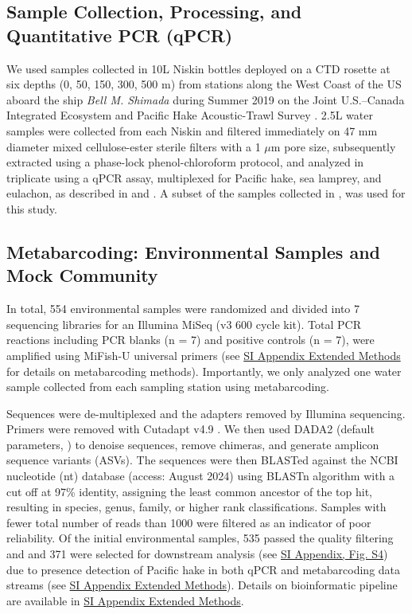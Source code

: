 \documentclass{article}
\begin{document}
\subsection*{Sample Collection, Processing, and Quantitative PCR (qPCR)}
We used samples collected in 10L Niskin bottles deployed on a CTD rosette at six depths (0, 50, 150, 300, 500 m) from stations along the West Coast of the US aboard the ship \textit{Bell M. Shimada} during Summer 2019 on the Joint U.S.–Canada Integrated Ecosystem and Pacific Hake Acoustic-Trawl Survey \cite{deblois2020}. 2.5L water samples were collected from each Niskin and filtered immediately on 47 mm diameter mixed cellulose-ester sterile filters with a 1 $\mu$m pore size, subsequently extracted using a phase-lock phenol-chloroform protocol, and analyzed in triplicate using a qPCR assay, multiplexed for Pacific hake, sea lamprey, and eulachon, as described in \cite{ramon-laca2021} and \cite{shelton2022}. A subset of the samples collected in \cite{shelton2022}, was used for this study. 

\subsection*{Metabarcoding: Environmental Samples and Mock Community}
In total, 554 environmental samples were randomized and divided into 7 sequencing libraries for an Illumina MiSeq (v3 600 cycle kit). Total PCR reactions including PCR blanks (n = 7) and positive controls (n = 7), were amplified using MiFish-U universal primers \cite{miya2015} (see \href{SI_Appendix.pdf}{SI Appendix Extended Methods} for details on metabarcoding methods). Importantly, we only analyzed one water sample collected from each sampling station using metabarcoding.

Sequences were de-multiplexed and the adapters removed by Illumina sequencing. Primers were removed with Cutadapt v4.9 \cite{martin2011}. We then used DADA2 (default parameters, \cite{callahan2016}) to denoise sequences, remove chimeras, and generate amplicon sequence variants (ASVs). The sequences were then BLASTed against the NCBI nucleotide (nt) database (access: August 2024) using BLASTn algorithm with a cut off at 97\% identity, assigning the least common ancestor of the top hit, resulting in species, genus, family, or higher rank classifications. Samples with fewer total number of reads than 1000 were filtered as an indicator of poor reliability. Of the initial environmental samples, 535 passed the quality filtering and and 371 were selected for downstream analysis (see \href{SI_Appendix.pdf}{SI Appendix, Fig. S4}) due to presence detection of Pacific hake in both qPCR and metabarcoding data streams (see \href{SI_Appendix.pdf}{SI Appendix Extended Methods}). Details on bioinformatic pipeline are available in \href{SI_Appendix.pdf}{SI Appendix Extended Methods}.
\end{document}
